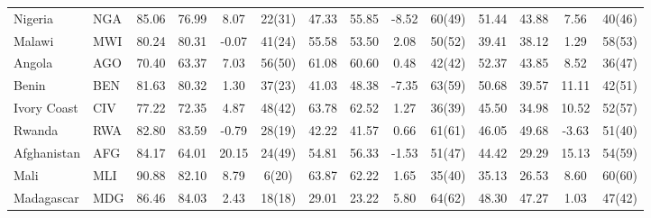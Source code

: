 \begin{longtable}{m{2.4cm}lcccc|cccc|cccc}
Nigeria                           & NGA           & 85.06            & 76.99              & 8.07             & 22(31)           & 47.33    & 55.85      & -8.52    & 60(49)   & 51.44           & 43.88             & 7.56            & 40(46)          \\
Malawi                            & MWI           & 80.24            & 80.31              & -0.07            & 41(24)           & 55.58    & 53.50      & 2.08     & 50(52)   & 39.41           & 38.12             & 1.29            & 58(53)          \\
Angola                            & AGO           & 70.40            & 63.37              & 7.03             & 56(50)           & 61.08    & 60.60      & 0.48     & 42(42)   & 52.37           & 43.85             & 8.52            & 36(47)          \\
Benin                             & BEN           & 81.63            & 80.32              & 1.30             & 37(23)           & 41.03    & 48.38      & -7.35    & 63(59)   & 50.68           & 39.57             & 11.11           & 42(51)          \\
Ivory Coast                    & CIV           & 77.22            & 72.35              & 4.87             & 48(42)           & 63.78    & 62.52      & 1.27     & 36(39)   & 45.50           & 34.98             & 10.52           & 52(57)          \\
Rwanda                            & RWA           & 82.80            & 83.59              & -0.79            & 28(19)           & 42.22    & 41.57      & 0.66     & 61(61)   & 46.05           & 49.68             & -3.63           & 51(40)          \\
Afghanistan                       & AFG           & 84.17            & 64.01              & 20.15            & 24(49)           & 54.81    & 56.33      & -1.53    & 51(47)   & 44.42           & 29.29             & 15.13           & 54(59)          \\
Mali                              & MLI           & 90.88            & 82.10              & 8.79             & 6(20)            & 63.87    & 62.22      & 1.65     & 35(40)   & 35.13           & 26.53             & 8.60            & 60(60)          \\
Madagascar                        & MDG           & 86.46            & 84.03              & 2.43             & 18(18)           & 29.01    & 23.22      & 5.80     & 64(62)   & 48.30           & 47.27             & 1.03            & 47(42)          \\

\end{longtable}
